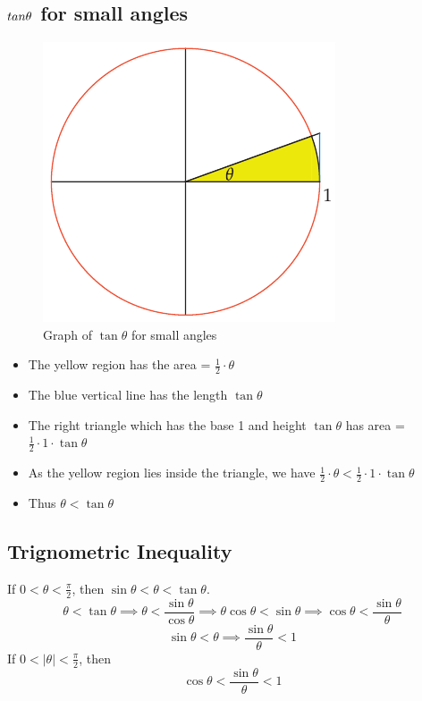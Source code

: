 \subsection{\(\\tan \theta\) for small angles}
\begin{figure}
    \centering
    \includegraphics[scale=0.4]{pics/31.png}
    \caption{Graph of $\tan \theta$ for small angles}
\end{figure}
\begin{itemize}
    \item The yellow region has the area = $\frac{1}{2} \cdot \theta$
    \item The blue vertical line has the length $\tan \theta$
    \item The right triangle which has the base 1 and height $\tan \theta$ has area = $\frac{1}{2} \cdot 1 \cdot \tan \theta$
    \item As the yellow region lies inside the triangle, we have $\frac{1}{2} \cdot \theta < \frac{1}{2} \cdot 1 \cdot \tan \theta$
    \item Thus $\theta < \tan \theta$
\end{itemize}

\subsection{Trignometric Inequality}
If $ 0 < \theta < \frac{\pi}{2} $, then $\sin \theta < \theta < \tan \theta $.
\begin{displaymath}
    \theta < \tan \theta \implies \theta < \frac{\sin \theta}{\cos \theta} \implies \theta \cos \theta < \sin \theta \implies \cos \theta < \frac{\sin \theta}{\theta}
\end{displaymath}
\begin{displaymath}
    \sin \theta < \theta \implies \frac{\sin \theta}{\theta} < 1
\end{displaymath}
If $ 0 < |\theta| < \frac{\pi}{2} $, then
\[ \cos \theta <  \frac{\sin \theta}{\theta} < 1 \]

